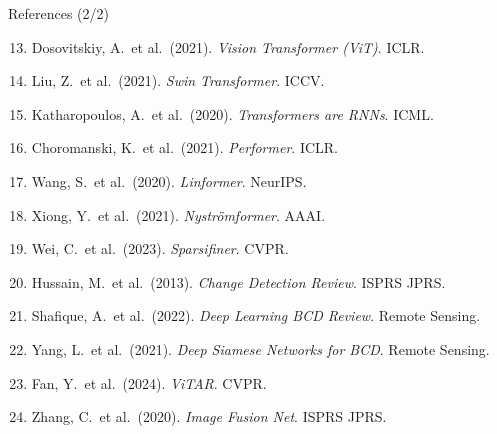 \documentclass[aspectratio=169]{beamer}
\begin{document}
\begin{frame}{References (2/2)}
\footnotesize
\begin{enumerate}
\setcounter{enumi}{12}
\item Dosovitskiy, A.\ et al.\ (2021). \textit{Vision Transformer (ViT)}. ICLR.
\item Liu, Z.\ et al.\ (2021). \textit{Swin Transformer}. ICCV.
\item Katharopoulos, A.\ et al.\ (2020). \textit{Transformers are RNNs}. ICML.
\item Choromanski, K.\ et al.\ (2021). \textit{Performer}. ICLR.
\item Wang, S.\ et al.\ (2020). \textit{Linformer}. NeurIPS.
\item Xiong, Y.\ et al.\ (2021). \textit{Nyströmformer}. AAAI.
\item Wei, C.\ et al.\ (2023). \textit{Sparsifiner}. CVPR.
\item Hussain, M.\ et al.\ (2013). \textit{Change Detection Review}. ISPRS JPRS.
\item Shafique, A.\ et al.\ (2022). \textit{Deep Learning BCD Review}. Remote Sensing.
\item Yang, L.\ et al.\ (2021). \textit{Deep Siamese Networks for BCD}. Remote Sensing.
\item Fan, Y.\ et al.\ (2024). \textit{ViTAR}. CVPR.
\item Zhang, C.\ et al.\ (2020). \textit{Image Fusion Net}. ISPRS JPRS.
\end{enumerate}
\end{frame}
\end{document}
